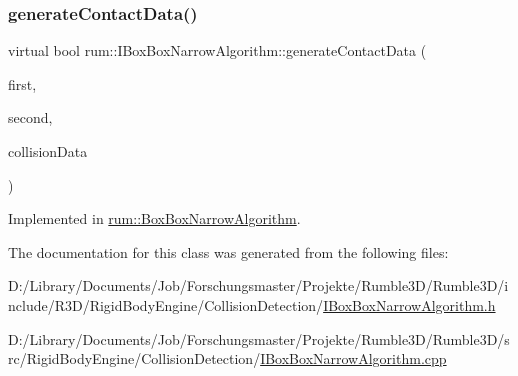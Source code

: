 \subsubsection{\texorpdfstring{generate\+Contact\+Data()}{generateContactData()}}
{\footnotesize\ttfamily virtual bool rum\+::\+I\+Box\+Box\+Narrow\+Algorithm\+::generate\+Contact\+Data (\begin{DoxyParamCaption}\item[{\mbox{\hyperlink{classrum_1_1_collision_box}{Collision\+Box}} $\ast$}]{first,  }\item[{\mbox{\hyperlink{classrum_1_1_collision_box}{Collision\+Box}} $\ast$}]{second,  }\item[{\mbox{\hyperlink{classrum_1_1_collision_data}{Collision\+Data}} \&}]{collision\+Data }\end{DoxyParamCaption})\hspace{0.3cm}{\ttfamily [pure virtual]}}



Implemented in \mbox{\hyperlink{classrum_1_1_box_box_narrow_algorithm_a5af29d0be22a3d56408d987643830058}{rum\+::\+Box\+Box\+Narrow\+Algorithm}}.



The documentation for this class was generated from the following files\+:\begin{DoxyCompactItemize}
\item 
D\+:/\+Library/\+Documents/\+Job/\+Forschungsmaster/\+Projekte/\+Rumble3\+D/\+Rumble3\+D/include/\+R3\+D/\+Rigid\+Body\+Engine/\+Collision\+Detection/\mbox{\hyperlink{_i_box_box_narrow_algorithm_8h}{I\+Box\+Box\+Narrow\+Algorithm.\+h}}\item 
D\+:/\+Library/\+Documents/\+Job/\+Forschungsmaster/\+Projekte/\+Rumble3\+D/\+Rumble3\+D/src/\+Rigid\+Body\+Engine/\+Collision\+Detection/\mbox{\hyperlink{_i_box_box_narrow_algorithm_8cpp}{I\+Box\+Box\+Narrow\+Algorithm.\+cpp}}\end{DoxyCompactItemize}
